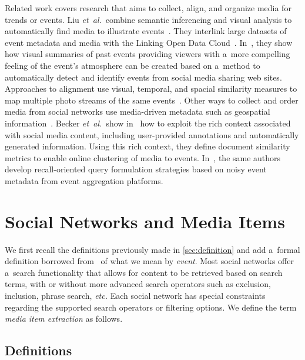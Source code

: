 Related work covers research
that aims to collect, align, and organize media
for trends or events.
Liu \emph{et~al.}\ combine semantic inferencing and visual analysis
to automatically find media to illustrate
events~\cite{liu2011events}.
They interlink large datasets of event metadata
and media with the Linking Open Data
Cloud~\cite{bizer2011statelodcloud,cyganiak2011lodcloud}.
In~\cite{liu2011socialmedia}, they show how visual summaries
of past events providing viewers with a~more compelling feeling
of the event's atmosphere can be created
based on a~method to automatically detect and identify events
from social media sharing web sites.
Approaches to alignment use visual, temporal,
and spacial similarity measures to map multiple photo streams of
the same events~\cite{yang2011photostream}.
Other ways to collect and order media from social networks use
media-driven metadata such as geospatial
information~\cite{crandall2009mappingphotos}.
Becker \emph{et~al.}\ show in~\cite{becker2010eventidentification}
how to exploit the rich context associated with social media
content, including user-provided annotations
and automatically generated information.
Using this rich context, they define document similarity metrics
to enable online clustering of media to events.
In~\cite{becker2012plannedevents}, the same authors develop 
recall-oriented query formulation strategies
based on noisy event metadata
from event aggregation platforms.

\section{Social Networks and Media Items}                                    \label{sec:social-networks}

We first recall the definitions previously made in
\autoref{sec:definition} and add a~formal definition
borrowed from~\cite{liu2011events}
of what we mean by \emph{event}.
Most social networks offer a~search functionality that allows for
content to be retrieved based on search terms,
with or without more advanced search operators
such as exclusion, inclusion, phrase search, \emph{etc.}
Each social network has special constraints
regarding the supported search operators or filtering options.
We define the term \emph{media item extraction}
as follows.

\subsection{Definitions}


